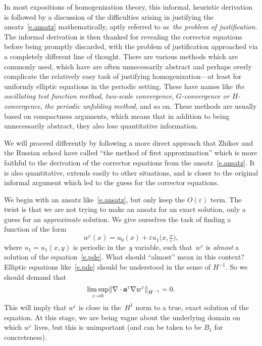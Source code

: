 \documentclass[11pt]{article} %
\numberwithin{equation}{section}
\theoremstyle{definition}
\let\originalleft\left
\let\originalright\right
\renewcommand{\left}{\mathopen{}\mathclose\bgroup\originalleft}
\renewcommand{\right}{\aftergroup\egroup\originalright}
\newcommand{\eps}{\varepsilon}
\newcommand{\ep}{\eps}
\renewcommand{\a}{\mathbf{a}}
\begin{document}
In most expositions of homogenization theory, 
this informal, heuristic derivation is followed by a discussion of the difficulties arising in justifying the ansatz~\eqref{e.ansatz} mathematically, aptly referred to as~\emph{the problem of justification}. The informal derivation is then thanked for revealing the corrector equations before being promptly discarded, with the problem of justification approached via a completely different line of thought. There are various methods which are commonly used, which have are often unnecessarily abstract and perhaps overly complicate the relatively easy task of justifying homogenization---at least  for uniformly elliptic equations in the periodic setting. These have names like \emph{the oscillating test function method}, \emph{two-scale convergence}, \emph{$G$-convergence or $H$-convergence},  \emph{the periodic unfolding method}, and so on. These methods are usually based on compactness arguments, which means that in addition to being unnecessarily abstract, they also lose quantitative information.  

\smallskip

We will proceed differently by following a more direct approach that Zhikov and the Russian school have called ``the method of first approximation'' which is more faithful to the derivation of the corrector equations from the ansatz~\eqref{e.ansatz}. It is also quantitative, extends easily to other situations, and is closer to the original informal argument which led to the guess for the corrector equations.

\smallskip

We begin with an ansatz like~\eqref{e.ansatz}, but only keep the $O(\ep)$ term. The twist is that we are not trying to make an ansatz for an exact solution, only a guess for an \emph{approximate} solution. We give ourselves the task of finding a function of the form
\begin{equation}
\label{e.guess}
w^\ep (x) = u_0(x) + \ep u_1\bigl( x,\tfrac x\ep \bigr), 
\end{equation}
where $u_1=u_1(x,y)$ is periodic in the~$y$ variable, such that~$w^\ep$ is \emph{almost} a solution of the equation~\eqref{e.pde}. What should ``almost'' mean in this context? Elliptic equations like~\eqref{e.pde} should be understood in the sense of $H^{-1}$. So we should demand that
\begin{equation}
\label{e.demand}
\limsup_{\ep\to 0}
\left\| \nabla\cdot \a^\ep\nabla w^\ep \right\|_{H^{-1}}  
=0.
\end{equation}
This will imply that $w^\ep$ is close in the~$H^1$ norm to a true, exact solution of the equation. At this stage, we are being vague about the underlying domain on which $w^\ep$ lives, but this is unimportant (and can be taken to be $B_1$ for concreteness). 
\end{document}

